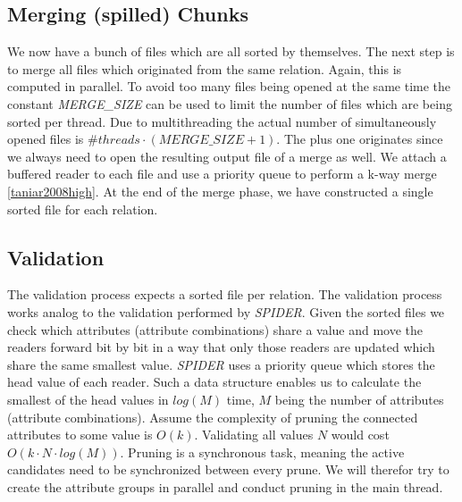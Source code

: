 \subsection{Merging (spilled) Chunks}
We now have a bunch of files which are all sorted by themselves. The next step is to merge all files which originated from the same relation. Again, this is computed in parallel. To avoid too many files being opened at the same time the constant \textit{MERGE\_SIZE} can be used to limit the number of files which are being sorted per thread. Due to multithreading the actual number of simultaneously opened files is $\#threads \cdot (MERGE\_SIZE + 1)$. The plus one originates since we always need to open the resulting output file of a merge as well. We attach a buffered reader to each file and use a priority queue to perform a k-way merge \ref{taniar2008high}. At the end of the merge phase, we have constructed a single sorted file for each relation.

\subsection{Validation}\label{sec:spind_val}
The validation process expects a sorted file per relation. The validation process works analog to the validation performed by \textit{SPIDER}. Given the sorted files we check which attributes (attribute combinations) share a value and move the readers forward bit by bit in a way that only those readers are updated which share the same smallest value. \textit{SPIDER} uses a priority queue which stores the head value of each reader. Such a data structure enables us to calculate the smallest of the head values in $log(M)$ time, $M$ being the number of attributes (attribute combinations). Assume the complexity of pruning the connected attributes to some value is $O(k)$. Validating all values $N$ would cost $O(k \cdot N \cdot log(M))$. Pruning is a synchronous task, meaning the active candidates need to be synchronized between every prune. We will therefor try to create the attribute groups in parallel and conduct pruning in the main thread.

